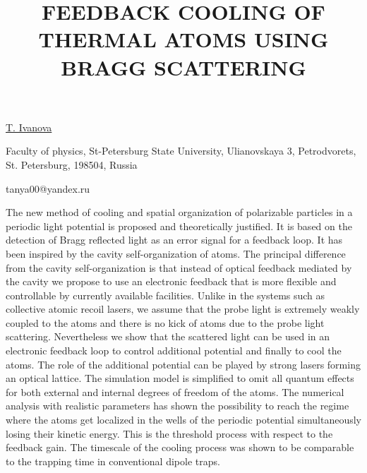 \title{FEEDBACK COOLING OF THERMAL ATOMS USING BRAGG SCATTERING}

\underline{T. Ivanova}

{\normalsize{
\vspace{-4mm} Faculty of physics, St-Petersburg State University, Ulianovskaya 3,
Petrodvorets, St. Petersburg, 198504, Russia


\email tanya00@yandex.ru}}

The new method of cooling and spatial organization of polarizable  particles in a periodic light
potential is proposed and theoretically justified. It is based on the detection of Bragg reflected
light as an error signal for a feedback loop. It has been inspired by the cavity self-organization
of atoms. The principal difference from the cavity self-organization is that instead of optical
feedback mediated by the cavity we propose to use an electronic feedback that is more flexible and
controllable by currently available facilities. Unlike in the systems such as collective atomic
recoil lasers, we assume that the probe light is extremely weakly coupled to the atoms and there is
no kick of atoms due to the probe light scattering. Nevertheless we show that the scattered light
can be used in an electronic feedback loop to control additional potential and finally to cool the
atoms. The role of the additional potential can be played by strong lasers forming an optical
lattice.
The simulation model is simplified to omit all quantum effects for both external and
internal degrees of freedom of the atoms. The numerical analysis with realistic parameters has shown
the possibility to reach the regime where the atoms get localized in the wells of the periodic
potential simultaneously losing their kinetic energy. This is the threshold process with respect to
the feedback gain. The timescale of the cooling process was shown to be comparable to the trapping
time in conventional dipole traps.

\vspace{\baselineskip}
